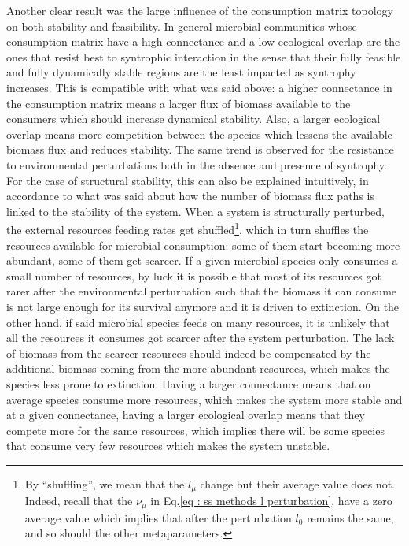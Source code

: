 \documentclass[12pt, titlepage]{report}
\begin{document}
Another clear result was the large influence of the consumption matrix topology on both stability and feasibility. In general microbial communities whose consumption matrix have a high connectance and a low ecological overlap are the ones that resist best to syntrophic interaction in the sense that their fully feasible and fully dynamically stable regions are the least impacted as syntrophy increases. This is compatible with what was said above: a higher connectance in the consumption matrix means a larger flux of biomass available to the consumers which should increase dynamical stability. Also, a larger ecological overlap means more competition between the species which lessens the available biomass flux and reduces stability.  The same trend is observed for the resistance to environmental perturbations both in the absence and presence of syntrophy. For the case of structural stability, this can also be explained intuitively, in accordance to what was said about how the number of biomass flux paths is linked to the stability of the system. When a system is structurally perturbed, the external resources feeding rates get shuffled\footnote{By ``shuffling'', we mean that the $l_\mu$ change but their average value does not. Indeed, recall that the $\nu_\mu$ in Eq.\eqref{eq : ss methods l perturbation}, have a zero average value which implies that after the perturbation $l_0$ remains the same, and so should the other metaparameters.}, which in turn shuffles the resources available for microbial consumption: some of them start becoming more abundant, some of them get scarcer. If a given microbial species only consumes a small number of resources, by luck it is possible that most of its resources got rarer after the environmental perturbation such that the biomass it can consume is not large enough for its survival anymore and it is driven to extinction. On the other hand, if said microbial species feeds on many resources, it is unlikely that all the resources it consumes got scarcer after the system perturbation. The lack of biomass from the scarcer resources should indeed be compensated by the additional biomass coming from the more abundant resources, which makes the species less prone to extinction. Having a larger connectance means that on average species consume more resources, which makes the system more stable and at a given connectance, having a larger ecological overlap means that they compete more for the same resources, which implies there will be some species that consume very few resources which makes the system unstable.
\end{document}
